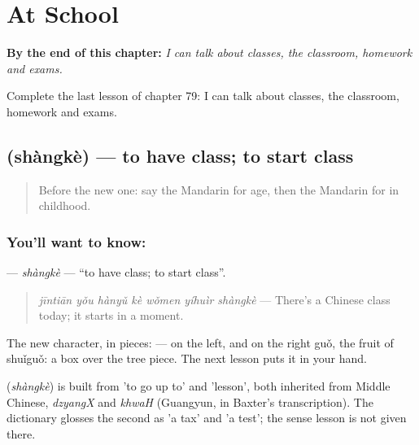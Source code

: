 
\chapter{At School}
\label{ch:zh-at-school}

\begin{chapteropening}
\textbf{By the end of this chapter:} \emph{I can talk about classes, the classroom, homework and exams.}

Complete the last lesson of chapter 79: I can talk about classes, the classroom, homework and exams.
\end{chapteropening}

\section[\texorpdfstring{\zh{上课} (shàngkè)}{上课 (shàngkè)}]{ (shàngkè) — to have class; to start class}

\label{lesson:ZH-C79-shangke}



\begin{quote}
Before the new one: say the Mandarin for age, then the Mandarin for in childhood.
\end{quote}

\subsection*{You'll want to know: }
\textbf{} — \emph{shàngkè} — \textquotedblleft{}to have class; to start class\textquotedblright{}.

\begin{quote}
\textbf{} \emph{jīntiān yǒu hànyǔ kè wǒmen yíhuìr shàngkè} — There's a Chinese class today; it starts in a moment.
\end{quote}

The new character, in pieces:  —  on the left, and on the right guǒ, the fruit of shuǐguǒ: a box over the tree piece. The next lesson puts it in your hand.

\begin{cousinweb}
\textbf{} (\emph{shàngkè}) is built from  'to go up to' and  'lesson', both inherited from Middle Chinese, \emph{dzyangX} and \emph{khwaH} (Guangyun, in Baxter's transcription). The dictionary glosses the second as 'a tax' and 'a test'; the sense lesson is not given there.
\end{cousinweb}

